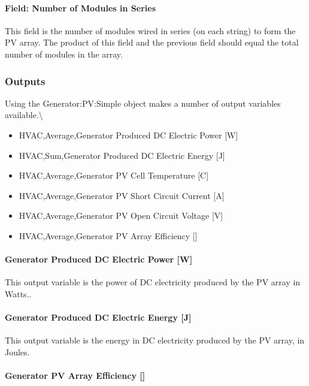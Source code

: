 \paragraph{Field: Number of Modules in Series}\label{field-number-of-modules-in-series}

This field is the number of modules wired in series (on each string) to form the PV array. The product of this field and the previous field should equal the total number of modules in the array.

\subsubsection{Outputs}\label{outputs-11-001}

Using the Generator:PV:Simple object makes a number of output variables available.\textbackslash{}

\begin{itemize}
\item
  HVAC,Average,Generator Produced DC Electric Power {[}W{]}
\item
  HVAC,Sum,Generator Produced DC Electric Energy {[}J{]}
\item
  HVAC,Average,Generator PV Cell Temperature {[}C{]}
\item
  HVAC,Average,Generator PV Short Circuit Current {[}A{]}
\item
  HVAC,Average,Generator PV Open Circuit Voltage {[}V{]}
\item
  HVAC,Average,Generator PV Array Efficiency {[]}
\end{itemize}

\paragraph{Generator Produced DC Electric Power {[}W{]}}\label{generator-produced-dc-electric-power-w-2}

This output variable is the power of DC electricity produced by the PV array in Watts..

\paragraph{Generator Produced DC Electric Energy {[}J{]}}\label{generator-produced-dc-electric-energy-j}

This output variable is the energy in DC electricity produced by the PV array, in Joules.

\paragraph{\texorpdfstring{Generator PV Array Efficiency {[]}}{Generator PV Array Efficiency }}\label{generator-pv-array-efficiency}

